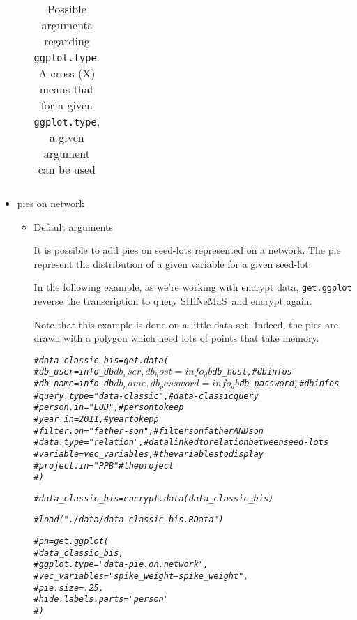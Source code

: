 \documentclass{article}\usepackage[]{graphicx}\usepackage[]{color}
\makeatletter
\newcommand{\hlcom}[1]{\textcolor[rgb]{0.678,0.584,0.686}{\textit{#1}}}%
\newenvironment{kframe}{%
 \def\at@end@of@kframe{}%
 \ifinner\ifhmode%
  \def\at@end@of@kframe{\end{minipage}}%
  \begin{minipage}{\columnwidth}%
 \fi\fi%
 \def\FrameCommand##1{\hskip\@totalleftmargin \hskip-\fboxsep
 \colorbox{shadecolor}{##1}\hskip-\fboxsep
     \hskip-\linewidth \hskip-\@totalleftmargin \hskip\columnwidth}%
 \MakeFramed {\advance\hsize-\width
   \@totalleftmargin\z@ \linewidth\hsize
   \@setminipage}}%
 {\par\unskip\endMakeFramed%
 \at@end@of@kframe}
\newenvironment{knitrout}{}{} %
\newcommand{\BD}{SHiNeMaS}
\makeatother
\begin{document}
\begin{itemize}
\begin{itemize}
\begin{center}
\begin{table}[H]
\begin{tabular}{ 
p{} 
p{} 
p{}
ccccc 
}
\hline
\end{tabular}
\caption{Possible arguments regarding \texttt{ggplot.type}.
A cross (X) means that for a given \texttt{ggplot.type}, a given argument can be used}
\label{custom.plot}
\end{table}
\end{center}

\end{itemize}


\item pies on network

\begin{itemize}

\item Default arguments

It is possible to add pies on seed-lots represented on a network.
The pie represent the distribution of a given variable for a given seed-lot.

In the following example, as we're working with encrypt data, \texttt{get.ggplot} reverse the transcription to query \BD~and encrypt again.

Note that this example is done on a little data set.
Indeed, the pies are drawn with a polygon which need lots of points that take memory.

\begin{knitrout}
\color{fgcolor}\begin{kframe}
\begin{alltt}
\hlcom{#data_classic_bis = get.data(}
\hlcom{#	db_user = info_db$db_user, db_host = info_db$db_host, # db infos}
\hlcom{#	db_name = info_db$db_name, db_password = info_db$db_password, # db infos}
\hlcom{#	query.type = "data-classic", # data-classic query}
\hlcom{#	person.in = "LUD", # person to keep}
\hlcom{#	year.in = 2011, # year to kepp}
\hlcom{#	filter.on = "father-son", # filters on father AND son}
\hlcom{#	data.type = "relation", # data linked to relation between seed-lots}
\hlcom{#	variable = vec_variables, # the variables to display}
\hlcom{#	project.in = "PPB" # the project }
\hlcom{#)}


\hlcom{#data_classic_bis = encrypt.data(data_classic_bis)}

\hlcom{#load("./data/data_classic_bis.RData")}

\hlcom{#pn = get.ggplot(}
\hlcom{#	data_classic_bis, }
\hlcom{#	ggplot.type = "data-pie.on.network", }
\hlcom{#	vec_variables = "spike_weight---spike_weight", }
\hlcom{#	pie.size = .25, }
\hlcom{#	hide.labels.parts = "person"}
\hlcom{#	)}


\end{alltt}
\end{kframe}
\end{knitrout}
\end{itemize}
\end{itemize}
\end{document}
